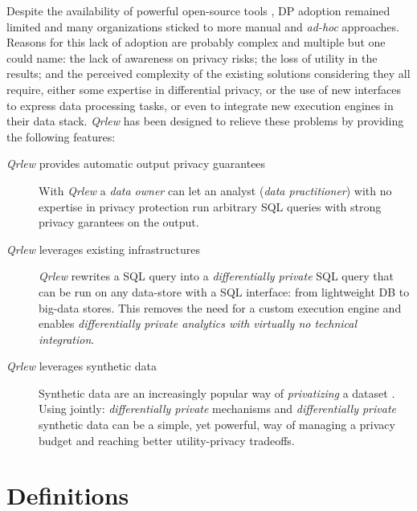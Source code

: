 \documentclass{article}
\newcommand{\qrlew}{\emph{Qrlew}}
\begin{document}
    Despite the availability of powerful open-source tools \cite{kotsogiannis2019privatesql, diffprivlib, OpenDP, PipelineDP, ZetaSQL, PrivacyOnBeam, johnson2020chorus, berghel2022tumult, yousefpour2021opacus}, DP adoption remained limited and many organizations sticked to more manual and \emph{ad-hoc} approaches.
    Reasons for this lack of adoption are probably complex and multiple but one could name: the lack of awareness on privacy risks; the loss of utility in the results; and the perceived complexity of the existing solutions considering they all require, either some expertise in differential privacy, or the use of new interfaces to express data processing tasks, or even to integrate new execution engines in their data stack.
    \qrlew{} \cite{Grislain_Qrlew_2023} has been designed to relieve these problems by providing the following features:
    \begin{description}
        \item[\qrlew{} provides automatic output privacy guarantees]
        With \qrlew{} a \emph{data owner} can let an analyst (\emph{data practitioner}) with no expertise in privacy protection run arbitrary SQL queries with strong privacy garantees on the output.
        \item[\qrlew{} leverages existing infrastructures]
        \qrlew{} rewrites a SQL query into a \emph{differentially private} SQL query that can be run on any data-store with a SQL interface: from lightweight DB to big-data stores.
    This removes the need for a custom execution engine and enables \emph{differentially private analytics with virtually no technical integration}.
        \item[\qrlew{} leverages synthetic data]
        Synthetic data are an increasingly popular way of \emph{privatizing} a dataset \cite{bowen2019comparative, mckenna2021winning, canale2022generative, sablayrolles2023privately, castellon2023dp}. Using jointly: \emph{differentially private} mechanisms and \emph{differentially private} synthetic data can be a simple, yet powerful, way of managing a privacy budget and reaching better utility-privacy tradeoffs.
    \end{description}
    
    
    \section{Definitions}
    
\end{document}

